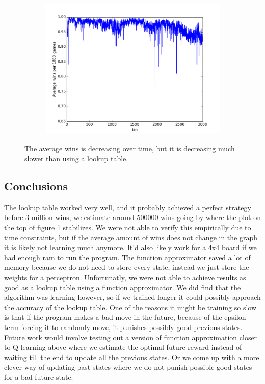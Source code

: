 \documentclass[12pt,a4paper]{article}
\begin{document}
\begin{figure}[h]
\centering
\begin{subfigure}[h]{0.45\textwidth}
\includegraphics[width=\textwidth]{Figures/Fxnaproxtd1.png}
\end{subfigure}
\caption{The average wins is decreasing over time, but it is decreasing much slower than using a lookup table.}
\label{fig:fxnaprox}
\end{figure}
\pagebreak
\subsection*{Conclusions}
The lookup table worked very well, and it probably achieved a perfect strategy before 3 million wins, we estimate around 500000 wins going by where the plot on the top of figure 1 stabilizes. We were not able to verify this empirically due to time constraints, but if the average amount of wins does not change in the graph it is likely not learning much anymore. It'd also likely work for a 4x4 board if we had enough ram to run the program.
The function approximator saved a lot of memory because we do not need to store every state, instead we just store the weights for a perceptron. Unfortunatly, we were not able to achieve results as good as a lookup table using a function approximator. We did find that the algorithm was learning however, so if we trained longer it could possibly approach the accuracy of the lookup table. One of the reasons it might be training so slow is that if the program makes a bad move in the future, because of the epsilon term forcing it to randomly move, it punishes possibly good previous states. Future work would involve testing out a version of function approximation closer to Q-learning above where we estimate the optimal future reward instead of waiting till the end to update all the previous states. Or we come up with a more clever way of updating past states where we do not punish possible good states for a bad future state.    
\end{document}
